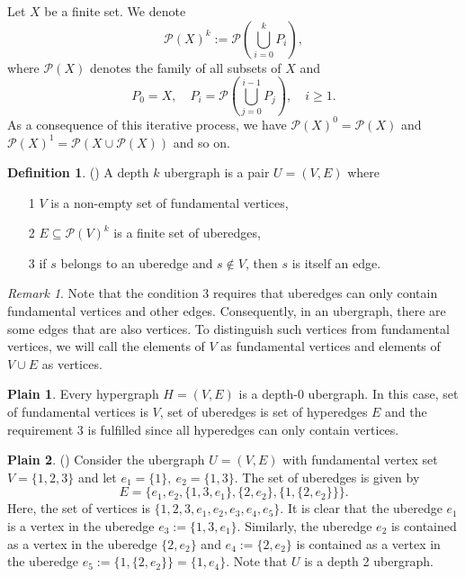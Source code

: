\documentclass[a4paper,12pt]{article}
\theoremstyle{definition}
\newtheorem{definition}{Definition}%
\newtheorem{plain}{Plain}%
\theoremstyle{remark}
\newtheorem{remark}{Remark}%
\begin{document}
Let $X$ be a finite set. We denote 
    \begin{equation*}
        \mathcal{P}(X)^k := \mathcal{P} \left( \bigcup_{i=0}^{k} P_i \right),
    \end{equation*}
where $\mathcal{P}(X)$ denotes the family of all subsets of $X$ and
    \begin{equation*}
        P_0 = X, \quad P_i =\mathcal{P} \left( \bigcup_{j=0}^{i-1} P_j \right), \quad i\geq 1. 
    \end{equation*}
As a consequence of this iterative process, we have $\mathcal{P}(X)^0 =\mathcal{P}(X)$ and $\mathcal{P}(X)^1 =\mathcal{P}(X\cup \mathcal{P}(X) )$ and so on. 
\begin{definition}(\cite{Joslyn2017UbergraphsAD})
    A depth $k$ ubergraph is a pair $U=(V,E)$ where 
    \begin{itemize}
        \item[1] $V$ is a non-empty set of fundamental vertices,
        \item[2] $E \subseteq \mathcal{P}(V)^k$ is a finite set of uberedges,
        \item[3] if $s$ belongs to an uberedge and $s \notin V$, then $s$ is itself an edge. 
    \end{itemize}  
\end{definition}
\begin{remark}
Note that the condition 3 requires that uberedges can only contain fundamental vertices and other edges. Consequently, in an ubergraph, there are some edges that are also vertices. To distinguish such vertices from fundamental vertices, we will call the elements of $V$ as fundamental vertices and elements of $V \cup E$ as vertices.
\end{remark}
\begin{plain}
    Every hypergraph $H=(V,E)$ is a depth-0 ubergraph. In this case, set of fundamental vertices is $V$, set of uberedges is set of hyperedges $E$ and the requirement 3 is fulfilled since all hyperedges can only contain vertices.    
\end{plain}
\begin{plain}\label{exuber}(\cite{Joslyn2017UbergraphsAD})
    Consider the ubergraph $U=(V,E)$ with fundamental vertex set $V=\{ 1,2,3 \}$ and let $e_1 =\{ 1 \} , \ e_2 =\{ 1,3\} $. The set of uberedges is given by $$E=\{ e_1 ,e_2, \{1,3, e_1\} , \{2, e_2 \}, \{ 1, \{2, e_2 \} \}  \} .$$
    Here, the set of vertices is $ \{ 1,2,3, e_1 , e_2 , e_3, e_4 , e_5 \} $. It is clear that the uberedge $e_1$ is a vertex in the uberedge $e_3 := \{1,3, e_1\}$. Similarly, the uberedge $e_2$ is contained as a vertex in the uberedge $ \{2, e_2 \}$ and $e_4 := \{2, e_2 \}$ is contained as a vertex in the uberedge $e_5 := \{ 1, \{2, e_2 \} \}=\{1, e_4 \}$. Note that $U $ is a depth 2 ubergraph. 
\end{plain}
\end{document}
